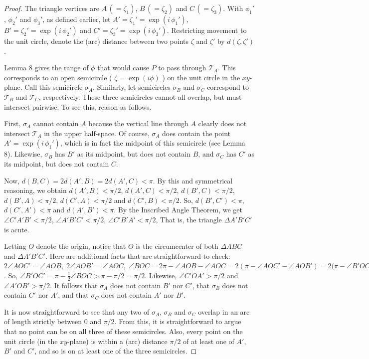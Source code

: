 \documentclass[a4paper, twoside]{article}
\begin{document}
\begin{proof}

The triangle vertices are $A \, (= \zeta_1)$, $B \, (= \zeta_2)$ and $C \, (= \zeta_3)$. With $\phi_1'$, $\phi_2'$ and $\phi_3'$, as defined earlier, let $A' = \zeta_1' = \exp( i \, \phi_1' )$, $B' = \zeta_2' = \exp( i \, \phi_2' )$ and $C' = \zeta_3' = \exp( i \, \phi_3' )$. Restricting movement to the unit circle, denote the (arc) distance between two points $\zeta$ and $\zeta'$ by $d(\zeta, \zeta')$. 

Lemma 8 gives the range of $\phi$ that would cause $P$ to pass through $\mathcal{T}_A$. This corresponds to an open semicircle ( $\zeta = \exp(i \phi)$ ) on the unit circle in the $xy$-plane. Call this semicircle $\sigma_A$. Similarly, let semicircles $\sigma_B$ and $\sigma_C$ correspond to $\mathcal{T}_B$ and $\mathcal{T}_C$, respectively. These three semicircles cannot all overlap, but must intersect pairwise. To see this, reason as follows. 

First, $\sigma_A$ cannot contain $A$ because the vertical line through $A$ clearly does not intersect $\mathcal{T}_A$ in the upper half-space. Of course, $\sigma_A$ does contain the point $A' = \exp(i \, \phi_1')$, which is in fact the midpoint of this semicircle (see Lemma 8). Likewise, $\sigma_B$ has $B'$ as its midpoint, but does not contain $B$, and $\sigma_C$ has $C'$ as its midpoint, but does not contain $C$. 

Now, $d(B, C) = 2 d(A', B) = 2 d(A', C) < \pi$. By this and symmetrical reasoning, we obtain $d(A', B) < \pi/2$, $d(A', C) < \pi/2$, $d(B', C) < \pi/2$, $d(B', A) < \pi/2$, $d(C', A) < \pi/2$ and $d(C', B) < \pi/2$. So, $d(B', C') < \pi$, $d(C', A') < \pi$ and $d(A', B') < \pi$. By the Inscribed Angle Theorem, we get $\angle C'A'B' < \pi/2$, $\angle A'B'C' < \pi/2$, $\angle C'B'A' < \pi/2$, That is, the triangle $\Delta A'B'C'$ is acute. 

Letting $O$ denote the origin, notice that $O$ is the circumcenter of both $\Delta ABC$ and $\Delta A'B'C'$.  Here are additional facts that are straightforward to check: $2 \angle AOC' = \angle AOB, \; 2 \angle AOB' = \angle AOC, \; \angle BOC = 2\pi - \angle AOB - \angle AOC = 2 (\pi - \angle AOC' - \angle AOB') = 2(\pi - \angle B'OC'$. So, $\angle B'OC' = \pi - \frac{1}{2} \angle BOC > \pi - \pi / 2 = \pi / 2$. Likewise, $\angle C'OA' > \pi / 2$ and $\angle A'OB' > \pi / 2$. It follows that $\sigma_A$ does not contain $B'$ nor $C'$, that $\sigma_B$ does not contain $C'$ nor $A'$, and that $\sigma_C$ does not contain $A'$ nor $B'$.

It is now straightforward to see that any two of $\sigma_A$, $\sigma_B$ and $\sigma_C$ overlap in an arc of length strictly between 0 and $\pi / 2$. From this, it is straightforward to argue that no point can be on all three of these semicircles. Also, every point on the unit circle (in the $xy$-plane) is within a (arc) distance $\pi / 2$ of at least one of $A'$, $B'$ and $C'$, and so is on at least one of the three semicircles.  

\end{proof}
\end{document}
